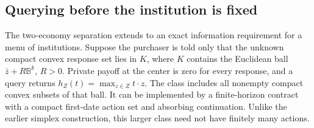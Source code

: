\subsection{Querying before the institution is fixed}
\label{sec:r19-query-complexity}
The two-economy separation extends to an exact information requirement for a menu of institutions. Suppose the purchaser is told only that the unknown compact convex response set lies in $K$, where $K$ contains the Euclidean ball $\bar z+R\mathbb B^k$, $R>0$. Private payoff at the center is zero for every response, and a query returns $h_Z(t)=\max_{z\in Z}t\cdot z$. The class includes all nonempty compact convex subsets of that ball. It can be implemented by a finite-horizon contract with a compact first-date action set and absorbing continuation. Unlike the earlier simplex construction, this larger class need not have finitely many actions.

